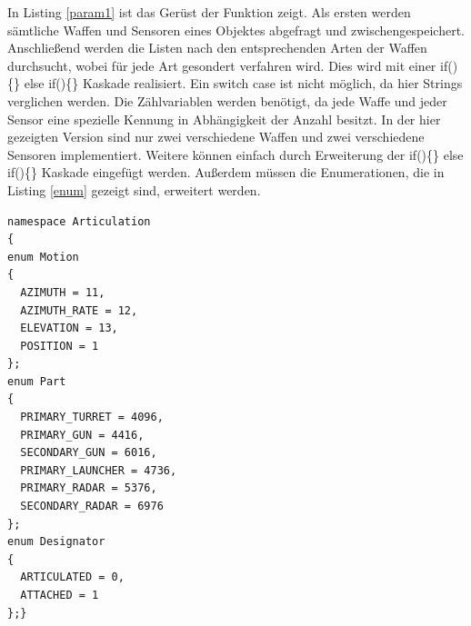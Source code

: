 In Listing \ref{param1} ist das Gerüst der Funktion zeigt. Als ersten werden sämtliche Waffen und Sensoren eines Objektes abgefragt und zwischengespeichert. Anschließend werden die Listen nach den entsprechenden Arten der Waffen durchsucht, wobei für jede Art gesondert verfahren wird. Dies wird mit einer \glqq if()\{\} else if()\{\}\grqq{} Kaskade realisiert. Ein \glqq switch case \grqq{} ist nicht möglich, da hier Strings verglichen werden. Die Zählvariablen werden benötigt, da jede Waffe und jeder Sensor eine spezielle Kennung in Abhängigkeit der Anzahl besitzt. In der hier gezeigten Version sind nur zwei verschiedene Waffen und zwei verschiedene Sensoren implementiert. Weitere können einfach durch Erweiterung der  \glqq if()\{\} else if()\{\}\grqq{} Kaskade eingefügt werden. Außerdem müssen die Enumerationen, die in Listing \ref{enum} gezeigt sind, erweitert werden. 
\begin{lstlisting}[caption = Parameter Enumeration ,label= enum]
namespace Articulation
{
enum Motion
{
  AZIMUTH = 11,
  AZIMUTH_RATE = 12,
  ELEVATION = 13,
  POSITION = 1
};
enum Part
{
  PRIMARY_TURRET = 4096,
  PRIMARY_GUN = 4416,
  SECONDARY_GUN = 6016,
  PRIMARY_LAUNCHER = 4736,
  PRIMARY_RADAR = 5376,
  SECONDARY_RADAR = 6976
};
enum Designator
{
  ARTICULATED = 0,
  ATTACHED = 1
};}
\end{lstlisting}

